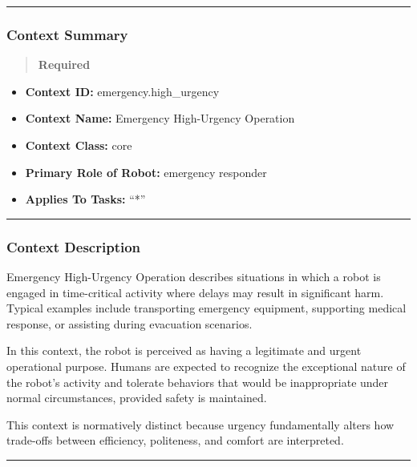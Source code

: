 \documentclass[utf8]{frontiers_suppmat} %
\providecommand{\tightlist}{%
  \setlength{\itemsep}{0pt}\setlength{\parskip}{0pt}}
\begin{document}
\begin{center}\rule{0.5\linewidth}{0.5pt}\end{center}

\subsubsection{Context Summary}\label{context-summary}

\begin{quote}
\textbf{Required}
\end{quote}

\begin{itemize}
\tightlist
\item
  \textbf{Context ID:} emergency.high\_urgency
\item
  \textbf{Context Name:} Emergency High-Urgency Operation
\item
  \textbf{Context Class:} core
\item
  \textbf{Primary Role of Robot:} emergency responder
\item
  \textbf{Applies To Tasks:} ``*''
\end{itemize}

\begin{center}\rule{0.5\linewidth}{0.5pt}\end{center}

\subsubsection{Context Description}\label{context-description}

Emergency High-Urgency Operation describes situations in which a robot
is engaged in time-critical activity where delays may result in
significant harm. Typical examples include transporting emergency
equipment, supporting medical response, or assisting during evacuation
scenarios.

In this context, the robot is perceived as having a legitimate and
urgent operational purpose. Humans are expected to recognize the
exceptional nature of the robot's activity and tolerate behaviors that
would be inappropriate under normal circumstances, provided safety is
maintained.

This context is normatively distinct because urgency fundamentally
alters how trade-offs between efficiency, politeness, and comfort are
interpreted.

\begin{center}\rule{0.5\linewidth}{0.5pt}\end{center}
\end{document}
